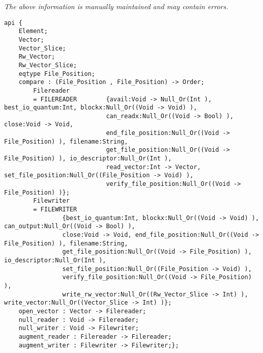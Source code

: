 \label{api:Winix\_Base\_File\_Io\_Driver\_For\_Os\_\_Premicrothread}

{\tiny \it The above information is manually maintained and may contain errors.}
\begin{verbatim}
api {
    Element;
    Vector;
    Vector_Slice;
    Rw_Vector;
    Rw_Vector_Slice;
    eqtype File_Position;
    compare : (File_Position , File_Position) -> Order;
        Filereader
        = FILEREADER        {avail:Void -> Null_Or(Int ), best_io_quantum:Int, blockx:Null_Or((Void -> Void) ),
                            can_readx:Null_Or((Void -> Bool) ), close:Void -> Void,
                            end_file_position:Null_Or((Void -> File_Position) ), filename:String,
                            get_file_position:Null_Or((Void -> File_Position) ), io_descriptor:Null_Or(Int ),
                            read_vector:Int -> Vector, set_file_position:Null_Or((File_Position -> Void) ),
                            verify_file_position:Null_Or((Void -> File_Position) )};
        Filewriter
        = FILEWRITER
                {best_io_quantum:Int, blockx:Null_Or((Void -> Void) ), can_output:Null_Or((Void -> Bool) ),
                close:Void -> Void, end_file_position:Null_Or((Void -> File_Position) ), filename:String,
                get_file_position:Null_Or((Void -> File_Position) ), io_descriptor:Null_Or(Int ),
                set_file_position:Null_Or((File_Position -> Void) ),
                verify_file_position:Null_Or((Void -> File_Position) ),
                write_rw_vector:Null_Or((Rw_Vector_Slice -> Int) ), write_vector:Null_Or((Vector_Slice -> Int) )};
    open_vector : Vector -> Filereader;
    null_reader : Void -> Filereader;
    null_writer : Void -> Filewriter;
    augment_reader : Filereader -> Filereader;
    augment_writer : Filewriter -> Filewriter;};
\end{verbatim}
